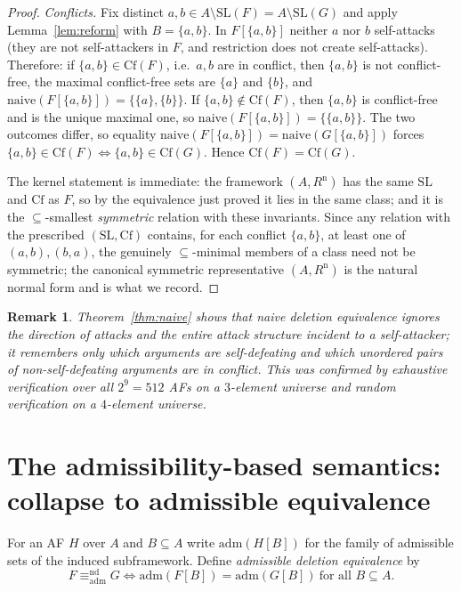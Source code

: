 \documentclass{amsart}
\newtheorem{remark}[theorem]{Remark}
\theoremstyle{remark}
\begin{document}
\begin{proof}
\emph{Conflicts.}  Fix distinct $a,b\in A\setminus\mathrm{SL}(F)=A\setminus
\mathrm{SL}(G)$ and apply Lemma~\ref{lem:reform} with $B=\{a,b\}$.  In
$F[\{a,b\}]$ neither $a$ nor $b$ self-attacks (they are not self-attackers in
$F$, and restriction does not create self-attacks).  Therefore: if
$\{a,b\}\in\mathrm{Cf}(F)$, i.e.\ $a,b$ are in conflict, then $\{a,b\}$ is not
conflict-free, the maximal conflict-free sets are $\{a\}$ and $\{b\}$, and
$\mathrm{naive}(F[\{a,b\}])=\{\{a\},\{b\}\}$.  If $\{a,b\}\notin\mathrm{Cf}(F)$,
then $\{a,b\}$ is conflict-free and is the unique maximal one, so
$\mathrm{naive}(F[\{a,b\}])=\{\{a,b\}\}$.  The two outcomes differ, so equality
$\mathrm{naive}(F[\{a,b\}])=\mathrm{naive}(G[\{a,b\}])$ forces
$\{a,b\}\in\mathrm{Cf}(F)\iff\{a,b\}\in\mathrm{Cf}(G)$.  Hence
$\mathrm{Cf}(F)=\mathrm{Cf}(G)$.

\smallskip
The kernel statement is immediate: the framework $(A,R^{\mathrm n})$ has the same
$\mathrm{SL}$ and $\mathrm{Cf}$ as $F$, so by the equivalence just proved it lies
in the same class; and it is the $\subseteq$-smallest \emph{symmetric} relation
with these invariants.  Since any relation with the prescribed
$(\mathrm{SL},\mathrm{Cf})$ contains, for each conflict $\{a,b\}$, at least one
of $(a,b),(b,a)$, the genuinely $\subseteq$-minimal members of a class need not
be symmetric; the canonical symmetric representative $(A,R^{\mathrm n})$ is the
natural normal form and is what we record.
\end{proof}

\begin{remark}
Theorem~\ref{thm:naive} shows that naive deletion equivalence ignores the
\emph{direction} of attacks and the entire attack structure incident to a
self-attacker; it remembers only \emph{which} arguments are self-defeating and
\emph{which unordered pairs} of non-self-defeating arguments are in conflict.
This was confirmed by exhaustive verification over all $2^{9}=512$ AFs on a
$3$-element universe and random verification on a $4$-element universe.
\end{remark}

\section{The admissibility-based semantics: collapse to admissible
equivalence}\label{sec:adm}

For an AF $H$ over $A$ and $B\subseteq A$ write $\mathrm{adm}(H[B])$ for the
family of admissible sets of the induced subframework.  Define
\emph{admissible deletion equivalence} by
\[
F\equiv^{\mathrm{nd}}_{\mathrm{adm}}G
\iff \mathrm{adm}(F[B])=\mathrm{adm}(G[B])\ \text{for all }B\subseteq A .
\]
\end{document}
